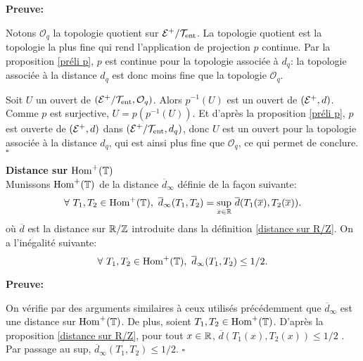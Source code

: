 	\textbf{Preuve:}
	\par Notons $\mathcal{O}_q$ la topologie quotient sur ${\mathcal{E}}^+/\mathcal{T}_{\mathrm{ent}}$. La topologie quotient est la topologie la plus fine qui rend l'application de projection $p$ continue. Par la proposition \ref{préli p}, $p$ est continue pour la topologie associée à $d_q$: la topologie associée à la distance $d_q$ est donc moins fine que la topologie $\mathcal{O}_q$.\\

	\par Soit $U$ un ouvert de $({\mathcal{E}}^+/\mathcal{T}_{\mathrm{ent}},\mathcal{O}_q)$. Alors $p^{-1}(U)$ est un ouvert de $({\mathcal{E}}^+,d)$. Comme $p$ est surjective, $U=p(p^{-1}(U))$. Et d'après la proposition \ref{préli p}, $p$ est ouverte de $({\mathcal{E}}^+,d)$ dans $(\mathcal{E}^+/\mathcal{T}_{\mathrm{ent}},d_q)$, donc $U$ est un ouvert pour la topologie associée à la distance $d_q$, qui est ainsi plus fine que $\mathcal{O}_q$, ce qui permet de conclure. \hfill $\square$\\








\begin{defippt}\label{distance sur HomT}\textbf{Distance sur $\mathrm{Hom}^+({\mathbb{T}})$}\\
	Munissons $\mathrm{Hom}^+({\mathbb{T}})$ de la distance $\overline{d}_\infty$ définie de la façon suivante:
	$$\forall\ T_1, T_2 \in \mathrm{Hom}^+({\mathbb{T}}),\ \overline{d}_\infty(T_1,T_2)= \underset{x\in {\mathbb{R}}}{\sup}\ \overline{d}(T_1(\overline{x}),T_2(\overline{x})).$$
	où $\overline{d}$ est la distance sur ${\mathbb{R}}/{\mathbb{Z}}$ introduite dans la définition \ref{distance sur R/Z}. On a l'inégalité suivante:
	$$\forall\ T_1, T_2 \in \mathrm{Hom}^+({\mathbb{T}}),\ \overline{d}_\infty(T_1,T_2)\leq 1/2.$$
\end{defippt}

	\textbf{Preuve:}
	\par On vérifie par des arguments similaires à ceux utilisés précédemment que $\overline{d}_\infty$ est une distance sur $\mathrm{Hom}^+({\mathbb{T}})$. De plus, soient $T_1, T_2 \in \mathrm{Hom}^+({\mathbb{T}})$. D'après la proposition \ref{distance sur R/Z}, pour tout $x \in {\mathbb{R}}$, $\overline{d}(T_1(x),T_2(x)) \leq1/2$ . Par passage au sup, $\overline{d}_\infty(T_1,T_2)\leq 1/2$. \hfill $\square$\\









